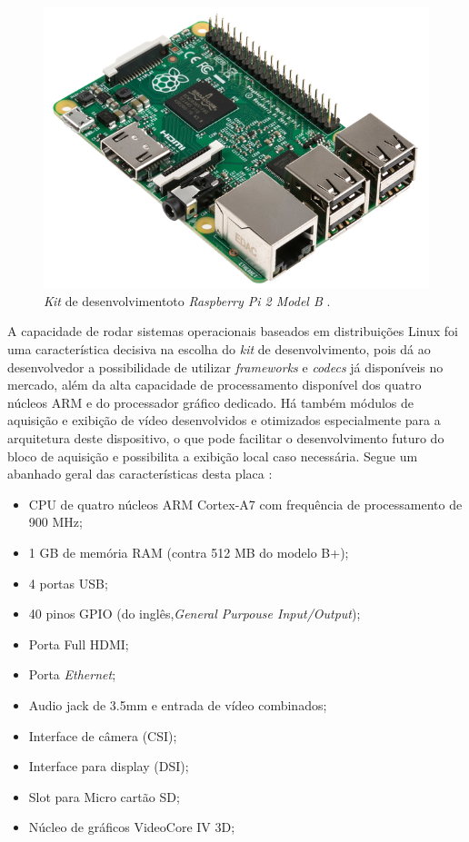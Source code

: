 \begin{figure}[h]
	\centering
	\includegraphics[scale=.5]{figuras/rpi2b.jpg}
	\caption{ \textit{Kit} de desenvolvimentoto \textit{Raspberry Pi 2 Model B} \cite{element14}.}
	\label{fig:rasp}
\end{figure}

A capacidade de rodar sistemas operacionais baseados em distribuições Linux foi uma característica decisiva na escolha do \textit{kit} de desenvolvimento, pois dá ao desenvolvedor a possibilidade de utilizar \textit{frameworks} e \textit{codecs} já disponíveis no mercado, além da alta capacidade de processamento disponível dos quatro núcleos ARM e do processador gráfico dedicado. Há também módulos de aquisição e exibição de vídeo desenvolvidos e otimizados especialmente para a arquitetura deste dispositivo, o que pode facilitar o desenvolvimento futuro do bloco de aquisição e possibilita a exibição local caso necessária. Segue um abanhado geral das características desta placa  \cite{raspberryOrg} :
\begin{itemize}
\item CPU de quatro núcleos ARM Cortex-A7 com frequência de processamento de 900 MHz;
\item  1 GB de memória RAM (contra 512 MB do modelo B+);
\item 4 portas USB;
\item 40 pinos GPIO (do inglês,\textit{General Purpouse Input/Output});
\item Porta Full HDMI;
\item Porta \textit{Ethernet};
\item Audio jack de 3.5mm e entrada de vídeo combinados;
\item Interface de câmera (CSI);
\item Interface para display (DSI);
\item Slot para Micro cartão SD;
\item Núcleo de gráficos VideoCore IV 3D;
\end{itemize}

